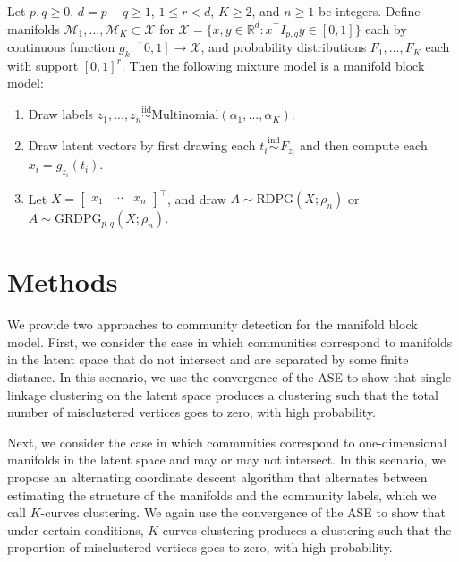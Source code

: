 \documentclass[12pt]{article}
\begin{document}
\begin{definition}
\label{def:manifold-block-model}
Let $p, q \geq 0$, $d = p + q \geq 1$, $1 \leq r < d$, $K \geq 2$, and $n \geq 1$ be integers.
Define manifolds $\mathcal{M}_1, ..., \mathcal{M}_K \subset \mathcal{X}$ for $\mathcal{X} = \{x, y \in \mathbb{R}^d : x^\top I_{p,q} y \in [0, 1] \}$ each by continuous function $g_k : [0, 1] \to \mathcal{X}$, 
and probability distributions $F_1, ..., F_K$ each with support $[0, 1]^r$. 
Then the following mixture model is a manifold block model: 

\begin{enumerate}
  \item Draw labels $z_1, ..., z_n \stackrel{\mathrm{iid}}{\sim}\mathrm{Multinomial}(\alpha_1, ..., \alpha_K)$. 
  \item Draw latent vectors by first drawing each $t_i \stackrel{\mathrm{ind}}{\sim}F_{z_i}$ and then compute each $x_i = g_{z_i}(t_i)$. 
  \item Let $X = \begin{bmatrix} x_1 & \cdots & x_n \end{bmatrix}^\top$, and draw $A \sim \mathrm{RDPG}(X; \rho_n)$ or $A \sim \mathrm{GRDPG}_{p,q}(X; \rho_n)$. 
\end{enumerate}
\end{definition}

\hypertarget{methods}{%
\section{Methods}\label{methods}}

We provide two approaches to community detection for the manifold block
model. First, we consider the case in which communities correspond to
manifolds in the latent space that do not intersect and are separated by
some finite distance. In this scenario, we use the convergence of the
ASE to show that single linkage clustering on the latent space produces
a clustering such that the total number of misclustered vertices goes to
zero, with high probability.

Next, we consider the case in which communities correspond to
one-dimensional manifolds in the latent space and may or may not
intersect. In this scenario, we propose an alternating coordinate
descent algorithm that alternates between estimating the structure of
the manifolds and the community labels, which we call \(K\)-curves
clustering. We again use the convergence of the ASE to show that under
certain conditions, \(K\)-curves clustering produces a clustering such
that the proportion of misclustered vertices goes to zero, with high
probability.
\end{document}
